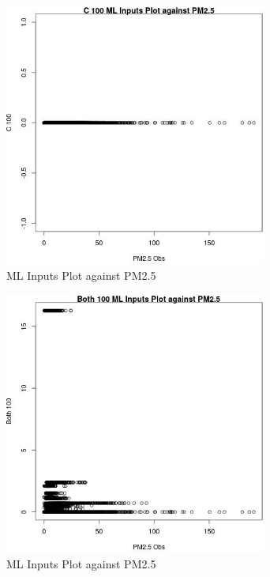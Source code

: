 \begin{figure} 
\centering  
\includegraphics[width=0.77\textwidth]{Code_Outputs/Report_ML_input_PM25_Step4_part_e_de_duplicated_aves_C_100vPM25_Obs.jpg} 
\caption{\label{fig:Report_ML_input_PM25_Step4_part_e_de_duplicated_avesC_100vPM25_Obs}ML Inputs Plot against PM2.5} 
\end{figure} 
 

\begin{figure} 
\centering  
\includegraphics[width=0.77\textwidth]{Code_Outputs/Report_ML_input_PM25_Step4_part_e_de_duplicated_aves_Both_100vPM25_Obs.jpg} 
\caption{\label{fig:Report_ML_input_PM25_Step4_part_e_de_duplicated_avesBoth_100vPM25_Obs}ML Inputs Plot against PM2.5} 
\end{figure} 
 

